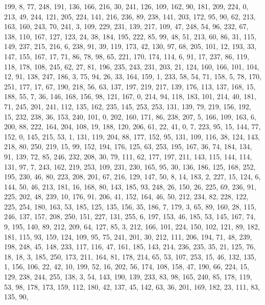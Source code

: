 \begin{DoxyCode}
       199, 8, 77, 248, 191, 136, 166, 216, 30, 241, 126, 109, 162, 90, 181, 209, 224, 0, 213, 49, 244, 121, 205,
       224, 141, 216, 236, 89, 238, 141, 203, 172, 95, 90, 62, 213, 163, 160, 243, 70, 241, 3, 109, 229, 231, 139,
       217, 109, 47, 248, 54, 96, 232, 67, 138, 110, 167, 127, 123, 24, 38, 184, 195, 222, 85, 99, 48, 51, 213, 60,
       86, 31, 115, 149, 237, 215, 216, 6, 238, 91, 39, 119, 173, 42, 130, 97, 68, 205, 101, 12, 193, 33, 147, 155,
       167, 17, 71, 86, 78, 98, 65, 221, 170, 174, 114, 6, 91, 17, 237, 86, 119, 118, 178, 108, 245, 62, 27, 81,
       196, 235, 243, 231, 203, 21, 124, 160, 166, 101, 104, 12, 91, 138, 247, 186, 3, 75, 94, 26, 33, 164, 159, 1,
       233, 58, 54, 71, 158, 5, 78, 170, 251, 177, 17, 67, 190, 218, 56, 63, 137, 197, 219, 217, 139, 176, 113, 137,
       168, 15, 188, 55, 7, 36, 146, 168, 156, 98, 121, 167, 0, 214, 94, 118, 183, 101, 214, 40, 181, 71, 245,
       201, 241, 112, 135, 162, 235, 145, 253, 253, 131, 139, 79, 219, 156, 192, 15, 232, 238, 36, 153, 240, 101, 0,
       202, 160, 171, 86, 238, 207, 5, 166, 109, 163, 6, 200, 88, 222, 164, 204, 108, 19, 188, 120, 206, 61, 22, 41,
       0, 7, 223, 95, 15, 144, 77, 152, 0, 145, 215, 53, 1, 131, 119, 204, 88, 177, 152, 95, 131, 109, 116, 38,
       124, 143, 218, 80, 250, 219, 15, 99, 152, 194, 176, 125, 63, 253, 195, 167, 36, 74, 184, 134, 91, 139, 72, 85,
       246, 232, 208, 30, 79, 111, 62, 177, 197, 211, 143, 115, 144, 114, 131, 97, 7, 243, 162, 219, 253, 109,
       231, 230, 165, 95, 30, 136, 186, 125, 168, 252, 195, 230, 46, 80, 223, 208, 201, 67, 216, 129, 147, 50, 8, 14,
       183, 2, 227, 15, 124, 6, 144, 50, 46, 213, 181, 16, 168, 80, 143, 185, 93, 248, 26, 150, 26, 225, 69, 236,
       91, 225, 202, 48, 239, 10, 176, 91, 206, 41, 152, 164, 46, 50, 212, 234, 82, 228, 122, 225, 254, 180, 163,
       53, 185, 125, 135, 156, 35, 186, 7, 179, 3, 65, 89, 160, 28, 115, 246, 137, 157, 208, 250, 151, 227, 131, 255,
       6, 197, 153, 46, 185, 53, 145, 167, 74, 9, 195, 140, 89, 212, 209, 64, 127, 85, 3, 212, 166, 101, 224, 150,
       102, 121, 89, 182, 181, 115, 93, 159, 124, 109, 95, 75, 241, 201, 30, 212, 111, 206, 194, 71, 48, 239, 198,
       248, 45, 148, 233, 117, 116, 47, 161, 185, 143, 214, 236, 235, 35, 21, 125, 76, 18, 18, 3, 185, 250, 173,
       211, 164, 81, 178, 214, 65, 53, 107, 253, 15, 46, 132, 135, 1, 156, 106, 22, 42, 10, 199, 52, 16, 202, 56,
       174, 108, 158, 47, 190, 66, 224, 15, 129, 238, 244, 255, 138, 3, 54, 143, 190, 139, 233, 83, 98, 165, 240, 85,
       178, 119, 53, 98, 178, 173, 159, 112, 180, 42, 137, 45, 142, 63, 36, 201, 169, 182, 23, 111, 83, 135, 90,

\end{DoxyCode}

